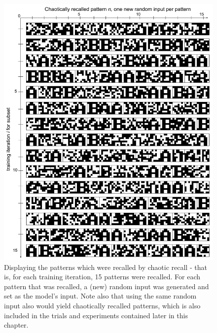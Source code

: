\begin{figure}
    \centering
    \includegraphics[width=12cm]{fig/AB-chaotic-recall-sync-tm0-dgw25}
    \caption{Displaying the patterns which were recalled by chaotic recall - that is, for each training iteration, 15 patterns were recalled. For each pattern that was recalled, a (new) random input was generated and set as the model's input. Note also that using the same random input also would yield chaotically recalled patterns, which is also included in the trials and experiments contained later in this chapter.}
    \label{fig:chaotic_recall_sync}
\end{figure}

